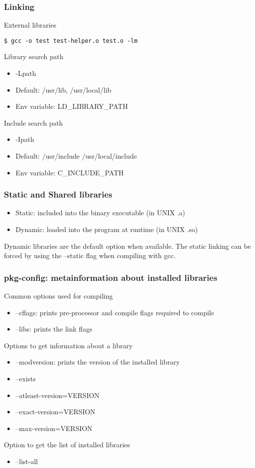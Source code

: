 \begin{frame}[fragile]
  \frametitle{Linking}

  External libraries
\begin{verbatim}
$ gcc -o test test-helper.o test.o -lm
\end{verbatim}

  Library search path
  \begin{itemize}
  \item -Lpath
  \item Default: /usr/lib, /usr/local/lib
  \item Env variable: LD\_LIBRARY\_PATH
  \end{itemize}

  Include search path
  \begin{itemize}
  \item -Ipath
  \item Default: /usr/include /usr/local/include
  \item Env variable: C\_INCLUDE\_PATH
  \end{itemize}
\end{frame}

\begin{frame}
  \frametitle{Static and Shared libraries}

  \begin{itemize}
  \item Static: included into the binary executable (in UNIX .a)
  \item Dynamic: loaded into the program at runtime (in UNIX .so)
  \end{itemize}

  Dynamic libraries are the default option when available. The static
  linking can be forced by using the --static flag when compiling with
  gcc.
\end{frame}

\begin{frame}
  \frametitle{pkg-config: metainformation about installed libraries}

  Common options used for compiling
  \begin{itemize}
  \item --cflags: prints pre-processor and compile flags required to
    compile
  \item --libs: prints the link flags
  \end{itemize}

  Options to get information about a library
  \begin{itemize}
  \item --modversion: prints the version of the installed library
  \item --exists
  \item --atleast-version=VERSION
  \item --exact-version=VERSION
  \item --max-version=VERSION
  \end{itemize}

  Option to get the list of installed libraries
  \begin{itemize}
  \item --list-all
  \end{itemize}
\end{frame}

